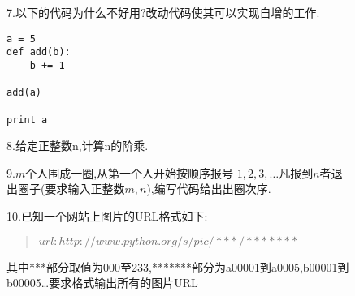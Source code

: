 \documentclass[12pt,a4paper]{article}
\begin{document}
\begin{figure}[H]
7.以下的代码为什么不好用?改动代码使其可以实现自增的工作.
\begin{lstlisting}
a = 5
def add(b):
    b += 1

add(a)

print a    
\end{lstlisting}
\end{figure}

\begin{figure}[H]
8.给定正整数n,计算n的阶乘.
\end{figure}

\begin{figure}[H]
9.$m$个人围成一圈,从第一个人开始按顺序报号 $1,2,3,\dots $凡报到$n$者退出圈子(要求输入正整数$m,n$),编写代码给出出圈次序.
\end{figure}

\begin{figure}[H]
10.已知一个网站上图片的URL格式如下:
\begin{quote}
$url:http://www.python.org/s/pic/***/*******$
\end{quote}

其中***部分取值为000至233,*******部分为a00001到a0005,b00001到b00005\dots 要求格式输出所有的图片URL
\end{figure}



    
\end{document}
